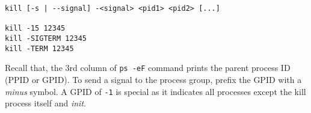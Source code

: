\begin{lstlisting}
kill [-s | --signal] -<signal> <pid1> <pid2> [...]

kill -15 12345
kill -SIGTERM 12345
kill -TERM 12345
\end{lstlisting}

Recall that, the 3rd column of \lstinline|ps -eF| command prints
the parent process ID (PPID or GPID). To send a signal to the
process group, prefix the GPID with a \textit{minus} symbol. A
GPID of \verb|-1| is special as it indicates all processes except
the kill process itself and \textit{init}.



\lstset{language=TeX}

